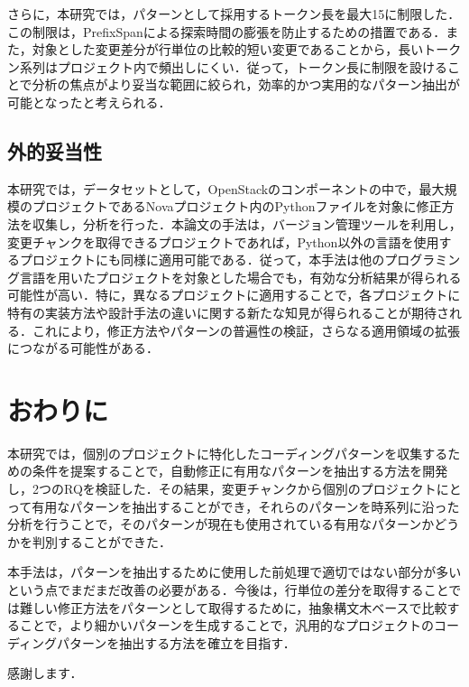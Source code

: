 \documentclass[11pt]{jreport}
\begin{document}
さらに，本研究では，パターンとして採用するトークン長を最大15に制限した．この制限は，PrefixSpanによる探索時間の膨張を防止するための措置である．また，対象とした変更差分が行単位の比較的短い変更であることから，長いトークン系列はプロジェクト内で頻出しにくい．従って，トークン長に制限を設けることで分析の焦点がより妥当な範囲に絞られ，効率的かつ実用的なパターン抽出が可能となったと考えられる．
\section{外的妥当性}
本研究では，データセットとして，OpenStackのコンポーネントの中で，最大規模のプロジェクトであるNovaプロジェクト内のPythonファイルを対象に修正方法を収集し，分析を行った．本論文の手法は，バージョン管理ツールを利用し，変更チャンクを取得できるプロジェクトであれば，Python以外の言語を使用するプロジェクトにも同様に適用可能である．従って，本手法は他のプログラミング言語を用いたプロジェクトを対象とした場合でも，有効な分析結果が得られる可能性が高い．特に，異なるプロジェクトに適用することで，各プロジェクトに特有の実装方法や設計手法の違いに関する新たな知見が得られることが期待される．これにより，修正方法やパターンの普遍性の検証，さらなる適用領域の拡張につながる可能性がある．
\chapter{おわりに}
本研究では，個別のプロジェクトに特化したコーディングパターンを収集するための条件を提案することで，自動修正に有用なパターンを抽出する方法を開発し，2つのRQを検証した．その結果，変更チャンクから個別のプロジェクトにとって有用なパターンを抽出することができ，それらのパターンを時系列に沿った分析を行うことで，そのパターンが現在も使用されている有用なパターンかどうかを判別することができた．

本手法は，パターンを抽出するために使用した前処理で適切ではない部分が多いという点でまだまだ改善の必要がある．今後は，行単位の差分を取得することでは難しい修正方法をパターンとして取得するために，抽象構文木ベースで比較することで，より細かいパターンを生成することで，汎用的なプロジェクトのコーディングパターンを抽出する方法を確立を目指す．

\begin{acknowledgements}
感謝します．

\end{acknowledgements}



\end{document}
